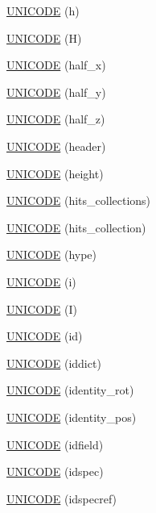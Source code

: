 \begin{DoxyCompactItemize}
\hyperlink{namespace_d_d4hep_1_1_x_m_l_abdfaaf089190f3abd1b049ac9edf14b0}{UNICODE} (h)
\item 
\hyperlink{namespace_d_d4hep_1_1_x_m_l_a77611e1b5cf440c48d4699749ba0f372}{UNICODE} (H)
\item 
\hyperlink{namespace_d_d4hep_1_1_x_m_l_aa79768b8ff1df8558c6d9728337c1e36}{UNICODE} (half\_\-x)
\item 
\hyperlink{namespace_d_d4hep_1_1_x_m_l_a2728b29b5e4ad608ec11792200fda807}{UNICODE} (half\_\-y)
\item 
\hyperlink{namespace_d_d4hep_1_1_x_m_l_ab8cb70c629eb5f794f4e1b3c31643643}{UNICODE} (half\_\-z)
\item 
\hyperlink{namespace_d_d4hep_1_1_x_m_l_a098579678467a09894ca436519f81c97}{UNICODE} (header)
\item 
\hyperlink{namespace_d_d4hep_1_1_x_m_l_a4331dcd20a75c31b41359497a1fd57f9}{UNICODE} (height)
\item 
\hyperlink{namespace_d_d4hep_1_1_x_m_l_a00b478450a6109ec8fc8c6bebb335397}{UNICODE} (hits\_\-collections)
\item 
\hyperlink{namespace_d_d4hep_1_1_x_m_l_a8aebb8c1d57f39f6f77ad9a201eda8bf}{UNICODE} (hits\_\-collection)
\item 
\hyperlink{namespace_d_d4hep_1_1_x_m_l_ae0e09e0e6c91d6db87d4a4425ee29979}{UNICODE} (hype)
\item 
\hyperlink{namespace_d_d4hep_1_1_x_m_l_a8a18515568e38a4d7fcce6dde96afc60}{UNICODE} (i)
\item 
\hyperlink{namespace_d_d4hep_1_1_x_m_l_a4a2b53c30fc46f6c678164c84e5fe971}{UNICODE} (I)
\item 
\hyperlink{namespace_d_d4hep_1_1_x_m_l_a04057694ceabef8f268fa221c04f7b01}{UNICODE} (id)
\item 
\hyperlink{namespace_d_d4hep_1_1_x_m_l_afc478bc85e421d1b40bdffe4b0c2962d}{UNICODE} (iddict)
\item 
\hyperlink{namespace_d_d4hep_1_1_x_m_l_aa0d82439cb124dc88a08a2d1bbe4e7b2}{UNICODE} (identity\_\-rot)
\item 
\hyperlink{namespace_d_d4hep_1_1_x_m_l_abe0ea758871a8a326da3ec46761cb5d5}{UNICODE} (identity\_\-pos)
\item 
\hyperlink{namespace_d_d4hep_1_1_x_m_l_a322a908d2d64b76ba8c3fca928008e94}{UNICODE} (idfield)
\item 
\hyperlink{namespace_d_d4hep_1_1_x_m_l_a153be9698d96d7be3a2d022a5c89c534}{UNICODE} (idspec)
\item 
\hyperlink{namespace_d_d4hep_1_1_x_m_l_a5fee26a2eb466ec9d2000aa9622db880}{UNICODE} (idspecref)

\end{DoxyCompactItemize}
